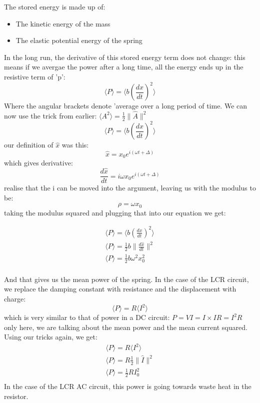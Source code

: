 \documentclass[10pt]{report}
\begin{document}
{{{The stored energy is made up of:
\begin{itemize}
	\item{The kinetic energy of the mass}
	\item{The elastic potential energy of the spring}
\end{itemize}
In the long run, the derivative of this stored energy term does not change: this means if we avergae the power after a long time, all the energy ends up in the resistive term of 'p': \[
\langle P\rangle=\langle b\left(\frac{dx}{dt}\right)^{2}\rangle
\] Where the angular brackets denote 'average over a long period of time. We can now use the trick from earlier: $\langle A^{2}\rangle=\frac{1}{2}\|\hat{A}\|^{2}$ \[
\langle P\rangle=\langle b\left(\frac{dx}{dt}\right)^{2}\rangle
\] our definition of $\hat{x}$ was this: 
\[
\hat{x}=x_{0}e^{i\left(\omega t+\Delta\right)} 
\] which gives derivative: 
\[
\frac{d\hat{x}}{dt}=i\omega x_{0}e^{i\left(\omega t+\Delta\right)}
\] realise that the i can be moved into the argument, leaving us with the modulus to be: \[
\rho=\omega x_{0}
\] taking the modulus squared and plugging that into our equation we get: }
\begin{align*}
\langle P\rangle=\langle b\left(\frac{dx}{dt}\right)^{2}\rangle \\
\langle P\rangle=\frac{1}{2}b\|\frac{d\hat{x}}{dt}\|^{2} \\
\langle P\rangle=\frac{1}{2}b\omega^{2}x_{0}^{2} \\
\end{align*}
\par{And that gives us the mean power of the spring. In the case of the LCR circuit, we replace the damping constant with resistance and the displacement with charge: \[
\langle P\rangle=R\langle I^{2}\rangle
\] which is very similar to that of power in a DC circuit: $P=VI=I\times IR=I^{2}R$ only here, we are talking about the mean power and the mean current squared. Using our tricks again, we get: }
\begin{align*}
\langle P\rangle=R\langle I^{2}\rangle \\
\langle P\rangle=R\frac{1}{2}\|\hat{I}\|^{2} \\
\langle P\rangle=\frac{1}{2}RI_{0}^{2} \\
\end{align*}
In the case of the LCR AC circuit, this power is going towards waste heat in the resistor.

}}
\end{document}
